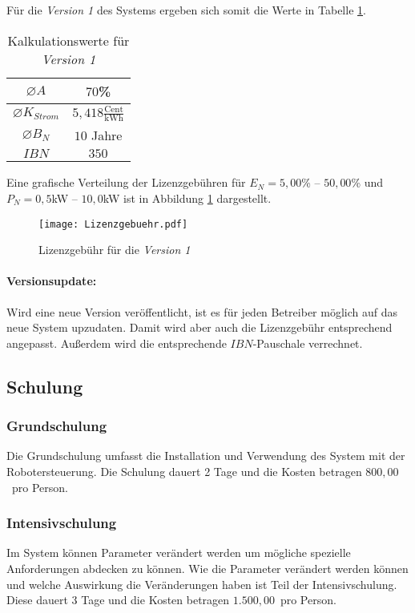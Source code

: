 Für die \textit{Version 1} des Systems ergeben sich somit die Werte in Tabelle \ref{tab:Kalkulationswerte}.
\begin{table}[h]
\centering
\begin{tabular}{|c|c|}
	\hline 
	$\varnothing A$ & $70$\% \\ 
	\hline 
	$\varnothing K_{Strom}$ & $5,418\frac{\text{Cent}}{\text{kWh}}$ \\ 
	\hline
	$\varnothing B_N$ & $10$ Jahre \\ 
	\hline 
	$IBN$ & $350$\officialeuro \\ 
	\hline 
\end{tabular}
\caption{Kalkulationswerte für \textit{Version 1}}
\label{tab:Kalkulationswerte}
\end{table}
Eine grafische Verteilung der Lizenzgebühren für $E_N = 5,00$\% -- $50,00$\% und $P_N = 0,5$kW -- $10,0$kW ist in Abbildung \ref{fig:lizenzgebuehr} dargestellt.

\begin{figure}[h]
	\centering
	\texttt{[image: Lizenzgebuehr.pdf]}
	\caption{Lizenzgebühr für die \textit{Version 1}}
	\label{fig:lizenzgebuehr}
\end{figure}

\paragraph*{Versionsupdate:}
Wird eine neue Version veröffentlicht, ist es für jeden Betreiber möglich auf das neue System upzudaten. Damit wird aber auch die Lizenzgebühr entsprechend angepasst. Außerdem wird die entsprechende $IBN$-Pauschale verrechnet.

\subsection{Schulung}
\subsubsection{Grundschulung}
Die Grundschulung umfasst die Installation und Verwendung des System mit der Robotersteuerung. Die Schulung dauert 2 Tage und die Kosten betragen $800,00$\officialeuro~pro Person.

\subsubsection{Intensivschulung}
Im System können Parameter verändert werden um mögliche spezielle Anforderungen abdecken zu können. Wie die Parameter verändert werden können und welche Auswirkung die Veränderungen haben ist Teil der Intensivschulung. Diese dauert 3 Tage und die Kosten betragen $1.500,00$\officialeuro~pro Person.


